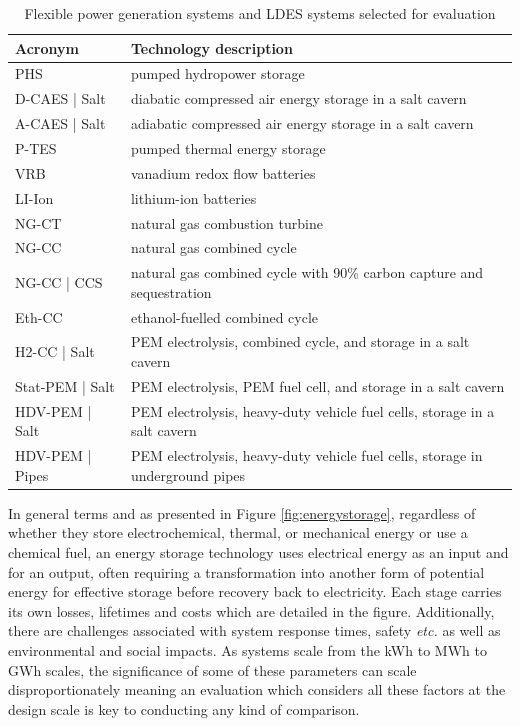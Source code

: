 \documentclass[preprint,12pt]{elsarticle}
\begin{document}
\begin{table}[h]
\centering
\begin{tabular}{l p{7.5cm}}
\toprule
\textbf{Acronym} & \textbf{Technology description} \\
\midrule
PHS	& pumped hydropower storage\\
D-CAES | Salt &	diabatic compressed air energy storage in a salt cavern \\
A-CAES | Salt &	adiabatic compressed air energy storage in a salt cavern \\
P-TES &	pumped thermal energy storage\\
VRB	& vanadium redox flow batteries\\
LI-Ion & lithium-ion batteries\\
NG-CT &	natural gas combustion turbine\\
NG-CC &	natural gas combined cycle\\
NG-CC | CCS	& natural gas combined cycle with 90\% carbon capture and sequestration \\
Eth-CC &	ethanol-fuelled combined cycle \\
H2-CC | Salt &	PEM electrolysis, combined cycle, and storage in a salt cavern \\
Stat-PEM | Salt	 & PEM electrolysis,  PEM fuel cell, and storage in a salt cavern \\
HDV-PEM | Salt & PEM electrolysis, heavy-duty vehicle fuel cells, storage in a salt cavern \\
HDV-PEM | Pipes	& PEM electrolysis,  heavy-duty vehicle fuel cells, storage in underground pipes \\
\bottomrule
\end{tabular}
\caption{Flexible power generation systems and LDES systems selected for evaluation}
\label{tab:FlexPowerSys} %
\end{table}

In general terms and as presented in Figure \ref{fig:energystorage}, regardless of whether they store electrochemical, thermal, or mechanical energy or use a chemical fuel, an energy storage technology uses electrical energy as an input and for an output, often requiring a transformation into another form of potential energy for effective storage before recovery back to electricity. Each stage carries its own losses, lifetimes and costs which are detailed in the figure. Additionally, there are challenges associated with system response times, safety \textit{etc.} as well as environmental and social impacts. As systems scale from the kWh to MWh to GWh scales, the significance of some of these parameters can scale disproportionately meaning an evaluation which considers all these factors at the design scale is key to conducting any kind of comparison. 
\end{document}
